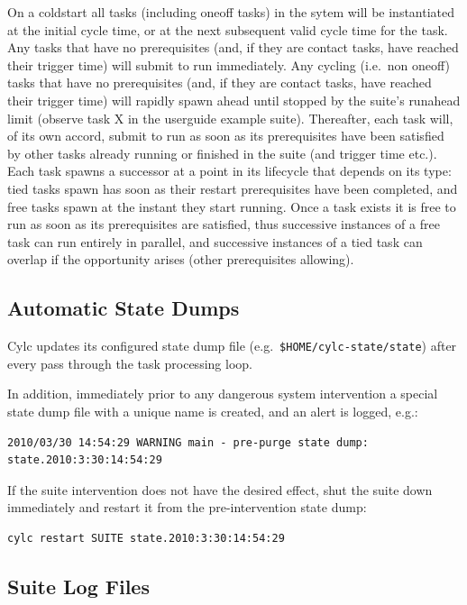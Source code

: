 \documentclass[11pt,a4paper]{article}
\begin{document}
On a coldstart all tasks (including oneoff tasks) in the sytem will be
instantiated at the initial cycle time, or at the next subsequent valid
cycle time for the task. Any tasks that have no prerequisites (and, if
they are contact tasks, have reached their trigger time) will submit to
run immediately. Any cycling (i.e.\ non oneoff) tasks that have no
prerequisites (and, if they are contact tasks, have reached their
trigger time) will rapidly spawn ahead until stopped by the suite's
runahead limit (observe task X in the userguide example suite).
Thereafter, each task will, of its own accord, submit to run as soon as
its prerequisites have been satisfied by other tasks already running or
finished in the suite (and trigger time etc.).  Each task spawns a
successor at a point in its lifecycle that depends on its type: tied
tasks spawn has soon as their restart prerequisites have been completed,
and free tasks spawn at the instant they start running.  Once a task
exists it is free to run as soon as its prerequisites are satisfied,
thus successive instances of a free task can run entirely in parallel,
and successive instances of a tied task can overlap if the opportunity
arises (other prerequisites allowing).

\subsection{Automatic State Dumps}
\label{AutomaticStateDumps}

Cylc updates its configured state dump file (e.g.\
\lstinline=$HOME/cylc-state/state=) after every pass through the task 
processing loop.

In addition, immediately prior to any dangerous system intervention a 
special state dump file with a unique name is created, and an alert is
logged, e.g.:

\begin{lstlisting}
2010/03/30 14:54:29 WARNING main - pre-purge state dump: state.2010:3:30:14:54:29
\end{lstlisting}

If the suite intervention does not have the desired effect, shut the suite 
down immediately and restart it from the pre-intervention state dump:

\begin{lstlisting}
cylc restart SUITE state.2010:3:30:14:54:29
\end{lstlisting}

\subsection{Suite Log Files}
\label{SuiteLogFiles}
\end{document}

